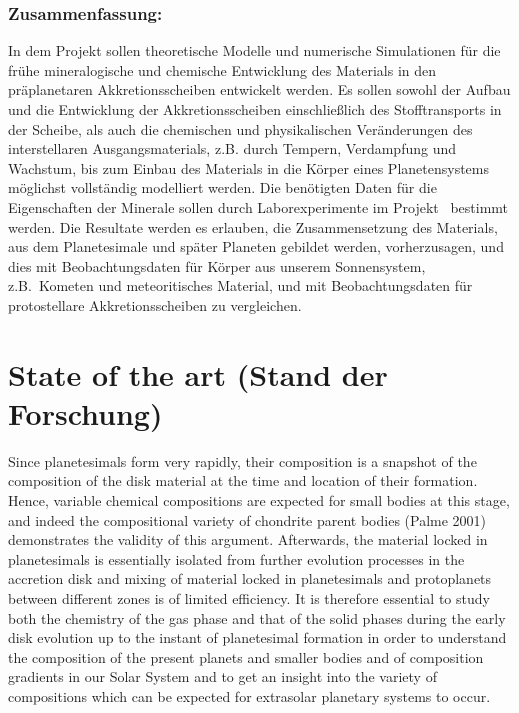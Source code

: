 \subsubsection{Zusammenfassung:}
In dem Projekt sollen theoretische Modelle und numerische Simulationen
f\"ur die fr\"uhe mineralogische und chemische Entwicklung des Materials in den
pr\"a\-planetaren Akkretionsscheiben entwickelt werden. Es sollen sowohl der
Aufbau und die Ent\-wicklung der Akkretionsscheiben einschlie\ss lich des
Stofftransports in der Scheibe, als auch die chemischen und physikalischen
Ver\"anderungen des interstellaren Ausgangsmaterials, z.B. durch Tempern,
Verdampfung und Wachstum, bis zum Einbau des Materials in die K\"orper eines
Plane\-tensystems m\"oglichst vollst\"andig modelliert werden. Die ben\"otigten
Daten f\"ur die Eigenschaften der Minerale sollen durch Laborexperimente im
Projekt \projlattard\ bestimmt werden. Die Resultate werden es erlauben, die
Zusammensetzung des Materials, aus dem Planetesimale und sp\"ater Planeten
gebildet werden, vorherzusagen, und dies mit Beobachtungsdaten f\"ur K\"orper
aus unserem Sonnensystem, z.B.\ Kometen und meteoritisches Material, und mit
Beobachtungsdaten f\"ur protostellare Akkretionsscheiben zu vergleichen.

\section{State of the art (Stand der Forschung)}

Since planetesimals form very rapidly, their composition is a snapshot of
the composition of the disk material at the time and location of their
formation. Hence, variable chemical compositions are expected for small bodies at this stage, and indeed the compositional variety of chondrite parent bodies (Palme 2001) demonstrates the validity of this argument. Afterwards, the material locked in planetesimals is essentially isolated from
further evolution processes in the accretion disk and mixing of material locked
in planetesimals and protoplanets between different zones is of limited
efficiency. It is therefore essential to study both the chemistry of the
gas phase and that of the solid phases during the early disk evolution up to
the instant of planetesimal formation in order to understand the composition
of the present planets and smaller bodies and of composition gradients in
our Solar System and to get an insight into the variety of compositions
which can be expected for extrasolar planetary systems to occur.

